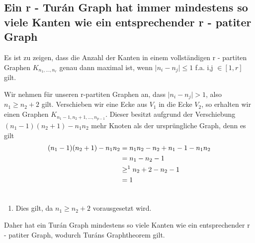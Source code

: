 \documentclass[12pt, a4paper]{article}
\begin{document}
\subsection{Ein r - Turán Graph hat immer mindestens so viele Kanten wie ein entsprechender r - patiter Graph}
\label{theorem:ein-turan-graph-hat-immer-mindestens-so-viele-kanten-wie-ein-entsprechender-r-patiter-graph}
Es ist zu zeigen, dass die Anzahl der Kanten in einem vollständigen r - partiten Graphen $K_{n_1,...,n_r}$ genau dann maximal ist, wenn $\mid n_i - n_j \mid \le 1$ f.a. i,j $\in [1, r]$ gilt.

Wir nehmen für unseren r-partiten Graphen an, dass $\mid n_i - n_j \mid > 1$, also $n_1 \ge n_2 + 2$ gilt.
Verschieben wir eine Ecke aus $V_1$ in die Ecke $V_2$, so erhalten wir einen Graphen $K_{n_1 - 1, n_2 + 1,...,n_{p - 1}}$. Dieser besitzt aufgrund der Verschiebung $(n_1 - 1)(n_2 + 1) - n_1 n_2$ mehr Knoten als der ursprüngliche Graph, denn es gilt
\begin{gather}
\begin{split}(n_1 - 1)(n_2 + 1) - n_1 n_2 &= n_1 n_2 - n_2 + n_1 - 1 - n_1 n_2 \\
&= n_1 - n_2 - 1 \\
&\ge^1 n_2 + 2 - n_2 - 1 \\
&= 1\end{split}\notag\\\begin{split}\end{split}\notag
\end{gather}\begin{enumerate}
\item {}
Dies gilt, da $n_1 \ge n_2 + 2$ vorausgesetzt wird.

\end{enumerate}

Daher hat ein Turán Graph mindestens so viele Kanten wie ein entsprechender r - patiter Graph, wodurch Turáns Graphtheorem gilt.
\end{document}
